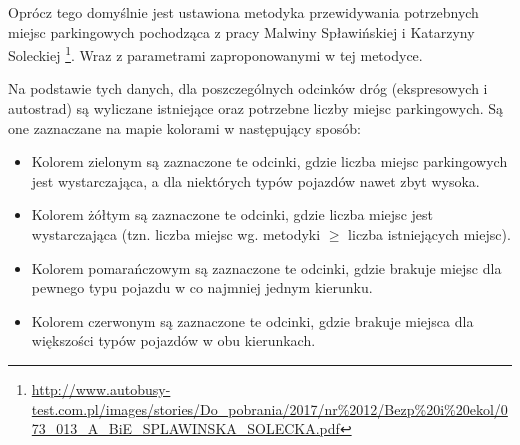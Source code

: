 \documentclass[10pt,paper=a4 BCOR0, DIV15]{scrbook} %
\begin{document}
    Oprócz tego domyślnie jest ustawiona metodyka przewidywania potrzebnych
    miejsc parkingowych pochodząca z pracy Malwiny Spławińskiej i Katarzyny
    Soleckiej
    \footnote{\url{http://www.autobusy-test.com.pl/images/stories/Do_pobrania/2017/nr\%2012/Bezp\%20i\%20ekol/073_013_A_BiE_SPLAWINSKA_SOLECKA.pdf}}.
        Wraz z parametrami zaproponowanymi w tej metodyce.

    Na podstawie tych danych, dla poszczególnych odcinków dróg (ekspresowych i
    autostrad) są wyliczane istniejące oraz potrzebne liczby miejsc
    parkingowych. Są one zaznaczane na mapie kolorami w następujący sposób:
    \begin{itemize}
      \item Kolorem zielonym są zaznaczone te odcinki, gdzie liczba miejsc
        parkingowych jest wystarczająca, a dla niektórych typów pojazdów nawet
        zbyt wysoka.
      \item Kolorem żółtym są zaznaczone te odcinki, gdzie liczba miejsc jest
        wystarczająca (tzn. liczba miejsc wg. metodyki $\ge$ liczba istniejących
        miejsc).
      \item Kolorem pomarańczowym są zaznaczone te odcinki, gdzie brakuje
        miejsc dla pewnego typu pojazdu w co najmniej jednym kierunku.
      \item Kolorem czerwonym są zaznaczone te odcinki, gdzie brakuje miejsca
        dla większości typów pojazdów w obu kierunkach.
     \end{itemize}
\end{document}
